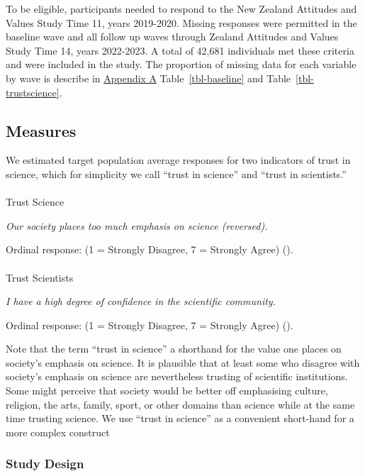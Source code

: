 \documentclass[
  single column]{article}
\makeatletter
\let\oldparagraph\paragraph
\renewcommand{\paragraph}{
    \@ifstar
      \xxxParagraphStar
      \xxxParagraphNoStar
  }
\newcommand{\xxxParagraphStar}[1]{\oldparagraph*{#1}\mbox{}}
\newcommand{\xxxParagraphNoStar}[1]{\oldparagraph{#1}\mbox{}}
\makeatother
\begin{document}
To be eligible, participants needed to respond to the New Zealand
Attitudes and Values Study Time 11, years 2019-2020. Missing responses
were permitted in the baseline wave and all follow up waves through
Zealand Attitudes and Values Study Time 14, years 2022-2023. A total of
42,681 individuals met these criteria and were included in the study.
The proportion of missing data for each variable by wave is describe in
\hyperref[appendix-a]{Appendix A} Table~\ref{tbl-baseline} and
Table~\ref{tbl-trustscience}.

\subsection{Measures}\label{measures}

We estimated target population average responses for two indicators of
trust in science, which for simplicity we call ``trust in science'' and
``trust in scientists.''

\paragraph{Trust Science}\label{trust-science}

\emph{Our society places too much emphasis on science (reversed).}

Ordinal response: (1 = Strongly Disagree, 7 = Strongly Agree)
().

\paragraph{Trust Scientists}\label{trust-scientists}

\emph{I have a high degree of confidence in the scientific community.}

Ordinal response: (1 = Strongly Disagree, 7 = Strongly Agree)
().

Note that the term ``trust in science'' a shorthand for the value one
places on society's emphasis on science. It is plausible that at least
some who disagree with society's emphasis on science are nevertheless
trusting of scientific institutions. Some might perceive that society
would be better off emphasising culture, religion, the arts, family,
sport, or other domains than science while at the same time trusting
science. We use ``trust in science'' as a convenient short-hand for a
more complex construct

\subsubsection{Study Design}\label{study-design}
\end{document}
